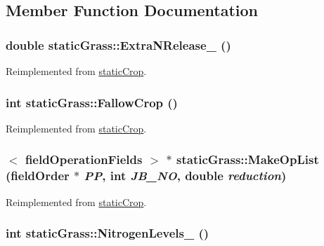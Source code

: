 \subsection{Member Function Documentation}
\hypertarget{classstatic_grass_aba65c94317d6a5a3c2414edf4e242453}{
\subsubsection[{ExtraNRelease\_\-}]{\setlength{\rightskip}{0pt plus 5cm}double staticGrass::ExtraNRelease\_\- ()}}
\label{classstatic_grass_aba65c94317d6a5a3c2414edf4e242453}


Reimplemented from \hyperlink{classstatic_crop_afe0cb8a7831afa941a37338f05227d67}{staticCrop}.\hypertarget{classstatic_grass_a493499c1294dcfcd85a9b019978e085f}{
\subsubsection[{FallowCrop}]{\setlength{\rightskip}{0pt plus 5cm}int staticGrass::FallowCrop ()}}
\label{classstatic_grass_a493499c1294dcfcd85a9b019978e085f}


Reimplemented from \hyperlink{classstatic_crop_ac8b14325e2ab05247e9b61e3af331f24}{staticCrop}.\hypertarget{classstatic_grass_af46c3861ac733cc63192ab16d2f83696}{
\subsubsection[{MakeOpList}]{$<$ {\bf fieldOperationFields} $>$ $\ast$ staticGrass::MakeOpList ({\bf fieldOrder} $\ast$ {\em PP}, \/  int {\em JB\_\-NO}, \/  double {\em reduction})}}
\label{classstatic_grass_af46c3861ac733cc63192ab16d2f83696}


Reimplemented from \hyperlink{classstatic_crop_a9b67ef1ae531a3afb32b63a4aeb5916b}{staticCrop}.\hypertarget{classstatic_grass_ab09bdebca7ebadbbe87286e7bfff149d}{
\subsubsection[{NitrogenLevels\_\-}]{\setlength{\rightskip}{0pt plus 5cm}int staticGrass::NitrogenLevels\_\- ()}}
\label{classstatic_grass_ab09bdebca7ebadbbe87286e7bfff149d}


